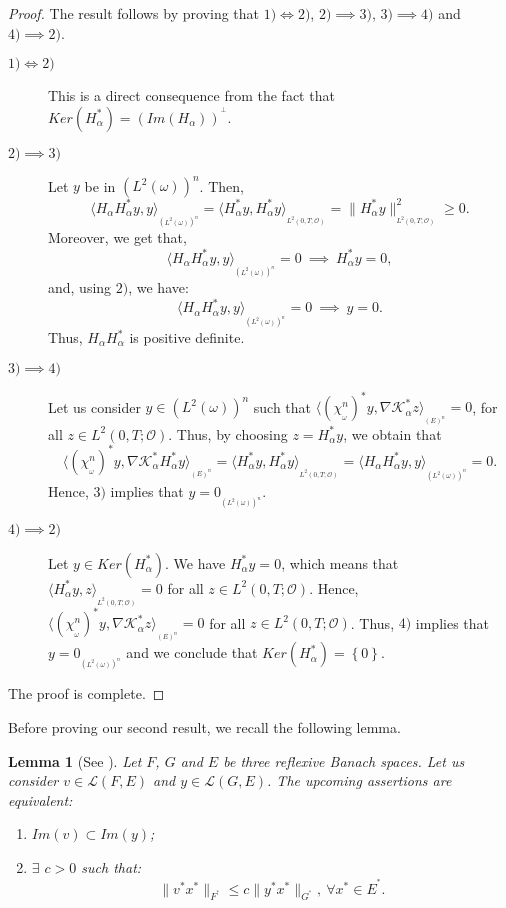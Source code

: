 \documentclass{article}
\newtheorem{lemma}[theorem]{Lemma}
\begin{document}
\begin{proof}
The result follows by proving that $1) \iff 2)$, 
$2) \implies 3)$, $3) \implies 4)$ and $4)\implies 2)$.
\begin{description}
\item[$1) \iff 2)$] This is a direct consequence from the fact that
$Ker(H_\alpha^*) = (Im(H_\alpha))^{^\perp}$.

\item[$2) \implies 3)$] Let $y$ be in $\left(L^2(\omega)\right)^n$. Then,
$$
\langle H_\alpha H_\alpha^*y,y\rangle_{_{\left(L^2(\omega)\right)^n}} 
= \langle H_\alpha^*y,H_\alpha^*y\rangle_{_{L^2(0,T;\mathcal{O})}} 
= \|H_\alpha^*y\|_{_{L^2(0,T;\mathcal{O})}}^2 \geq 0.
$$
Moreover, we get that,
$$
\langle H_\alpha H_\alpha^*y,y\rangle_{_{\left(L^2(\omega)\right)^n}}=0 
\ \implies \ H^*_\alpha y=0,
$$
and, using $2)$, we have:
$$
\langle H_\alpha H_\alpha^*y,y\rangle_{_{\left(L^2(\omega)\right)^n}}
=0 \ \implies \  y=0.
$$
Thus, $H_\alpha H_\alpha^*$ is positive definite. 

\item[$3) \implies 4)$] Let us consider $y\in \left(L^2(\omega)\right)^n$ 
such that $\langle\left(\chi_{_\omega}^n\right)^*y, 
\nabla\mathcal{K}_\alpha^*z \rangle_{_{\left(E\right)^n}} 
= 0$, for all $z\in L^2(0,T;\mathcal{O})$.
Thus, by choosing $z=H_\alpha^*y$, we obtain that
$$
\langle\left(\chi_{_\omega}^n\right)^*y, 
\nabla\mathcal{K}_\alpha^*H_\alpha^*y 
\rangle_{_{\left(E\right)^n}} = \langle H_\alpha^*y, 
H_\alpha^*y \rangle_{_{L^2(0,T;\mathcal{O})}} 
= \langle H_\alpha H_\alpha^*y, 
y \rangle_{_{\left(L^2(\omega)\right)^n}}=0.
$$
Hence, $3)$ implies that $y=0_{_{\left(L^2(\omega)\right)^n}}$. 

\item[$4)\implies 2)$] Let $y\in Ker\left(H_\alpha^*\right)$. 
We have $H_\alpha^*y=0$, which means that 
$\langle H_\alpha^* y,z\rangle_{_{L^2(0,T;\mathcal{O})}} =0$
for all $z\in L^2(0,T;\mathcal{O})$. Hence, 
$\langle \left(\chi_{_\omega}^n\right)^*y,
\nabla\mathcal{K}_\alpha^*z\rangle_{_{\left(E\right)^n}} =0$ 
for all $z\in L^2(0,T;\mathcal{O})$.
Thus, $4)$ implies that $y=0_{_{\left(L^2(\omega)\right)^n}}$ 
and we conclude that $Ker\left(H_\alpha^*\right) = \left\{0\right\}$.
\end{description}
The proof is complete.
\end{proof}

Before proving our second result, we recall the following lemma.

\begin{lemma}[See \cite{curtain.1978}]
\label{lemma}
Let $F$, $G$ and $E$ be three reflexive Banach spaces. 
Let us consider $v\in\mathcal{L}(F,E)$ and $y\in \mathcal{L}(G,E)$. 
The upcoming assertions are equivalent:
\begin{enumerate}
\item $Im(v) \subset Im(y)$;
\item $\exists$ $c>0$ such that:
$$
\|v^*x^*\|_{F^{^*}} \leq c \|y^*x^*\|_{G^{^*}}, \ \forall x^*\in E^{^*}.
$$
\end{enumerate}
\end{lemma}
\end{document}
